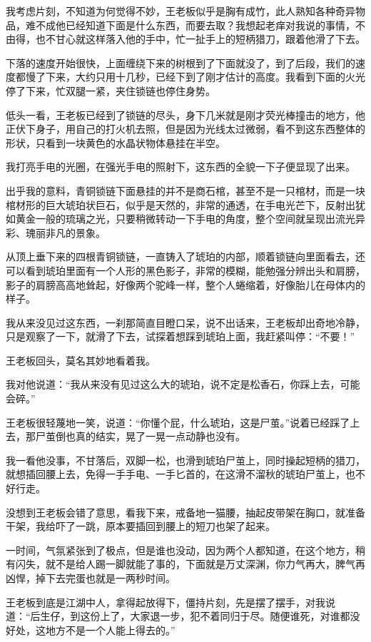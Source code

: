 我考虑片刻，不知道为何觉得不妙，王老板似乎是胸有成竹，此人熟知各种奇异物品，难不成他已经知道下面是什么东西，而要去取？我想起老痒对我说的事情，不由得，也不甘心就这样落入他的手中，忙一扯手上的短柄猎刀，跟着他滑了下去。

下落的速度开始很快，上面缠绕下来的树根到了下面就没了，到了后段，我们的速度都慢了下来，大约只用十几秒，已经下到了刚才估计的高度。我看到下面的火光停了下来，忙双腿一紧，夹住锁链也停住身势。

低头一看，王老板已经到了锁链的尽头，身下几米就是刚才荧光棒撞击的地方，他正伏下身子，用自己的打火机去照，但是因为光线太过微弱，看不到这东西整体的形状，只看到一块黄色的水晶状物体悬挂在半空。

我打亮手电的光圈，在强光手电的照射下，这东西的全貌一下子便显现了出来。

出乎我的意料，青铜锁链下面悬挂的并不是商石棺，甚至不是一只棺材，而是一块棺材形的巨大琥珀状巨石，似乎是天然的，非常的通透，在手电光芒下，反射出犹如黄金一般的琉璃之光，只要稍微转动一下手电的角度，整个空间就呈现出流光异彩、瑰丽非凡的景象。

从顶上垂下来的四根青铜锁链，一直铸入了琥珀的内部，顺着锁链向里面看去，还可以看到琥珀里面有一个人形的黑色影子，非常的模糊，能勉强分辨出头和肩膀，影子的肩膀高高地耸起，好像两个驼峰一样，整个人蜷缩着，好像胎儿在母体内的样子。

我从来没见过这东西，一刹那简直目瞪口呆，说不出话来，王老板却出奇地冷静，只是观察了一下，就滑了下去，试探着想踩到琥珀上面，我赶紧叫停：“不要！”

王老板回头，莫名其妙地看着我。

我对他说道：“我从来没有见过这么大的琥珀，说不定是松香石，你踩上去，可能会碎。”

王老板很轻蔑地一笑，说道：“你懂个屁，什么琥珀，这是尸茧。”说着已经踩了上去，那尸茧倒也真的结实，晃了一晃一点动静也没有。

我一看他没事，不甘落后，双脚一松，也滑到琥珀尸茧上，同时操起短柄的猎刀，就想插回腰上去，免得一手手电、一手匕首的，在这滑不溜秋的琥珀尸茧上，也不好行走。

没想到王老板会错了意思，看我下来，戒备地一猫腰，抽起皮带架在胸口，就准备干架，我给吓了一跳，原本要插回到腰上的短刀也架了起来。

一时间，气氛紧张到了极点，但是谁也没动，因为两个人都知道，在这个地方，稍有闪失，就不是给人踢一脚就能了事的，下面就是万丈深渊，你力气再大，脾气再凶悍，掉下去完蛋也就是一两秒时间。

王老板到底是江湖中人，拿得起放得下，僵持片刻，先是摆了摆手，对我说道：“后生仔，到这份上了，大家退一步，犯不着同归于尽。随便谁死，对谁都没好处，这地方不是一个人能上得去的。”

